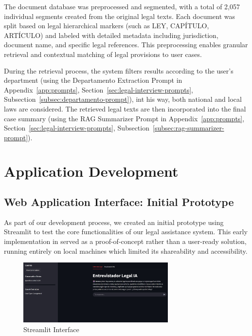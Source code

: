 The document database was preprocessed and segmented, with a total of 2,057 individual segments created from the original legal texts. 
Each document was split based on legal hierarchical markers (such as LEY, CAPÍTULO, ARTÍCULO) and labeled with detailed metadata including 
jurisdiction, document name, and specific legal references. This preprocessing enables granular retrieval and contextual matching of legal 
provisions to user cases.

During the retrieval process, the system filters results according to the user's department 
(using the Departamento Extraction Prompt in Appendix~\ref{app:prompts}, Section~\ref{sec:legal-interview-prompts}, 
Subsection~\ref{subsec:departamento-prompt}), int his way, both national and local laws are considered. 
The retrieved legal texts are then incorporated into the final case summary 
(using the RAG Summarizer Prompt in Appendix~\ref{app:prompts}, Section~\ref{sec:legal-interview-prompts}, 
Subsection~\ref{subsec:rag-summarizer-prompt}).

\section{Application Development}

\subsection{Web Application Interface: Initial Prototype}
\label{sec:web-interface}

As part of our development process, we created an initial prototype using Streamlit to test the core functionalities of our legal 
assistance system. This early implementation in served as a proof-of-concept rather than a user-ready solution, 
running entirely on local machines which limited its shareability and accessibility.

\begin{figure}[htbp]
    \centering
    \includegraphics[width=0.7\textwidth]{figures/streamlit.jpeg}
    \caption{Streamlit Interface}
    \label{fig:streamlit}
\end{figure}

